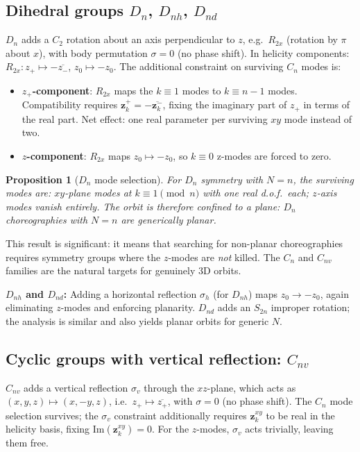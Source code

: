 \documentclass[12pt, a4paper]{article}
\theoremstyle{plain}
\newtheorem{proposition}[theorem]{Proposition}
\theoremstyle{definition}
\newcommand{\bfz}{\mathbf{z}}
\begin{document}
\subsection{Dihedral groups $D_n$, $D_{nh}$, $D_{nd}$}

$D_n$ adds a $C_2$ rotation about an axis perpendicular to $z$, e.g.\
$R_{2x}$ (rotation by $\pi$ about $x$), with body permutation $\sigma
= 0$ (no phase shift).  In helicity components:
$R_{2x} : z_+ \mapsto -\overline{z_-}$, $z_0 \mapsto -z_0$.
The additional constraint on surviving $C_n$ modes is:

\begin{itemize}[leftmargin=1.8em]
  \item \textbf{$z_+$-component}: $R_{2x}$ maps the $k\equiv 1$
        modes to $k \equiv n-1$ modes.  Compatibility requires
        $\bfz_k^+ = -\overline{\bfz_k^-}$, fixing the imaginary part
        of $z_+$ in terms of the real part.  Net effect: one real
        parameter per surviving $xy$ mode instead of two.
  \item \textbf{$z$-component}: $R_{2x}$ maps $z_0 \mapsto -z_0$,
        so $k\equiv 0$ z-modes are forced to zero.
\end{itemize}

\begin{proposition}[$D_n$ mode selection]
For $D_n$ symmetry with $N=n$, the surviving modes are:
$xy$-plane modes at $k \equiv 1 \pmod{n}$ with \emph{one} real
d.o.f.\ each; $z$-axis modes vanish entirely.  The orbit is
therefore confined to a plane: $D_n$ choreographies with $N=n$
are generically planar.
\end{proposition}

This result is significant: it means that searching for non-planar
choreographies requires symmetry groups where the $z$-modes are
\emph{not} killed.  The $C_n$ and $C_{nv}$ families are the
natural targets for genuinely 3D orbits.

\textbf{$D_{nh}$ and $D_{nd}$:} Adding a horizontal reflection
$\sigma_h$ (for $D_{nh}$) maps $z_0 \to -z_0$, again
eliminating $z$-modes and enforcing planarity.  $D_{nd}$ adds
an $S_{2n}$ improper rotation; the analysis is similar and also
yields planar orbits for generic $N$.

\subsection{Cyclic groups with vertical reflection: $C_{nv}$}

$C_{nv}$ adds a vertical reflection $\sigma_v$ through the $xz$-plane,
which acts as $(x,y,z) \mapsto (x,-y,z)$, i.e.\ $z_+ \mapsto
\overline{z_+}$, with $\sigma=0$ (no phase shift).  The $C_n$ mode
selection survives; the $\sigma_v$ constraint additionally requires
$\bfz_k^{xy}$ to be real in the helicity basis, fixing
$\mathrm{Im}(\bfz_k^{xy}) = 0$.  For the $z$-modes, $\sigma_v$ acts
trivially, leaving them free.
\end{document}
